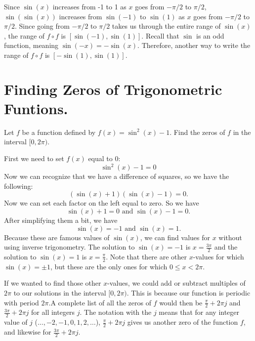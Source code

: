 \documentclass{ximera}
\begin{document}
\begin{example}
\begin{explanation}
\begin{enumerate}
Since $\sin(x)$ increases from -1 to 1 as $x$ goes from $-\pi/2$ to $\pi/2$, $\sin(\sin(x))$ increases from $\sin(-1)$ to $\sin(1)$ as $x$ goes from $-\pi/2$ to $\pi/2$. Since going from $-\pi/2$ to $\pi/2$ takes us through the entire range of $\sin(x)$, the range of $f \circ f$ is $[\sin(-1), \sin(1)]$. Recall that $\sin$ is an odd function, meaning $\sin(-x) = -\sin(x)$. Therefore, another way to write the range of $f \circ f$ is $[-\sin(1), \sin(1)]$. 
\end{enumerate}
\end{explanation}
\end{example}

\section{Finding Zeros of Trigonometric Funtions.}
\begin{example}
Let $f$ be a function defined by $f(x)=\sin^2(x)-1$. Find the zeros of $f$ in the interval $[0, 2\pi)$.
\begin{explanation}
First we need to set $f(x)$ equal to $0$:\\
\[
\sin^2(x)-1=0
\]
Now we can recognize that we have a difference of squares, so we have the following:
\[
(\sin(x)+1)(\sin(x)-1) = 0.
\]
Now we can set each factor on the left equal to zero. So we have
\[
\sin(x)+1=0 \text{ and } \sin(x)-1 =0.
\]
After simplifying them a bit, we have
\[
\sin(x) =-1 \text{ and } \sin(x)=1.
\]
Because these are famous values of $\sin(x)$, we can find values for $x$ without using inverse trigonometry. The solution to $\sin(x) = -1$ is $x = \frac{3\pi}{2}$ and the solution to $\sin(x) = 1$ is $x = \frac{\pi}{2}$. Note that there are other $x$-values for which $\sin(x) = \pm 1$, but these are the only ones for which $0 \le x < 2\pi$. 

If we wanted to find those other $x$-values, we could add or subtract multiples of $2\pi$ to our solutions in the interval $[0, 2\pi)$. This is because our function is periodic with period $2\pi$.A complete list of all the zeros of $f$ would then be $\frac{\pi}{2} + 2\pi j$ and $\frac{3\pi}{2} + 2\pi j$ for all integers $j$. The notation with the $j$ means that for any integer value of $j$ ($\ldots, -2, -1, 0, 1, 2, \ldots$), $\frac{\pi}{2} + 2\pi j$ gives us another zero of the function $f$, and likewise for $\frac{3\pi}{2} + 2\pi j$. 
\end{explanation}
\end{example}
\end{document}
